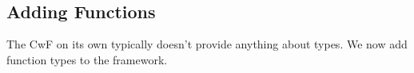 \begin{itemize}
\begin{code}
\<%
\\
%
\>[4]%
\>[9]\AgdaSymbol{:}\AgdaSpace{}%
\AgdaSpace{}%
\AgdaSpace{}%
\AgdaOperator{\AgdaInductiveConstructor{,}}\AgdaSpace{}%
\AgdaSpace{}%
\AgdaSpace{}%
\AgdaSpace{}%
\<%
\\
%
\>[4]%
\>[9]\AgdaSymbol{:}\AgdaSpace{}%
\AgdaSymbol{(}\AgdaSpace{}%
\AgdaOperator{\AgdaInductiveConstructor{,}}\AgdaSpace{}%
\AgdaSymbol{)}\AgdaSpace{}%
\AgdaSpace{}%
\AgdaSpace{}%
\AgdaSpace{}%
\AgdaSpace{}%
\AgdaSpace{}%
\AgdaSpace{}%
\AgdaOperator{\AgdaInductiveConstructor{,}}\AgdaSpace{}%
\AgdaSpace{}%
\AgdaOperator{\AgdaInductiveConstructor{[}}\AgdaSpace{}%
\AgdaSpace{}%
\AgdaOperator{\AgdaInductiveConstructor{]}}\<%
\end{code}
\end{itemize}

\subsection{Adding Functions}

The CwF on its own typically doesn't provide anything about types. We now add function types to the framework.

